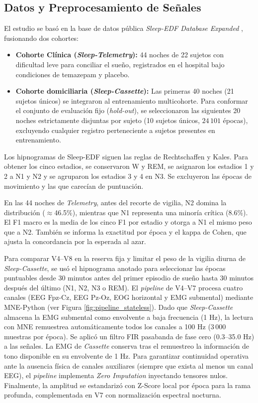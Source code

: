 \documentclass[conference]{IEEEtran}
\begin{document}
\subsection{Datos y Preprocesamiento de Señales}
El estudio se basó en la base de datos pública \textit{Sleep-EDF Database Expanded} \cite{sleepedfx_dataset,kemp2000,goldberger2000}, fusionando dos cohortes:
\begin{itemize}
    \item \textbf{Cohorte Clínica (\textit{Sleep-Telemetry}):} 44 noches de 22 sujetos con dificultad leve para conciliar el sueño, registrados en el hospital bajo condiciones de temazepam y placebo.
    \item \textbf{Cohorte domiciliaria (\textit{Sleep-Cassette}):} Las primeras 40 noches (21 sujetos únicos) se integraron al entrenamiento multicohorte. Para conformar el conjunto de evaluación fijo (\textit{hold-out}), se seleccionaron las siguientes 20 noches estrictamente disjuntas por sujeto (10 sujetos únicos, $24\,101$ épocas), excluyendo cualquier registro perteneciente a sujetos presentes en entrenamiento.
\end{itemize}

Los hipnogramas de Sleep-EDF siguen las reglas de Rechtschaffen y Kales. Para obtener los cinco estadios, se conservaron W y REM, se asignaron los estadios 1 y 2 a N1 y N2 y se agruparon los estadios 3 y 4 en N3. Se excluyeron las épocas de movimiento y las que carecían de puntuación.

En las 44 noches de \textit{Telemetry}, antes del recorte de vigilia, N2 domina la distribución ($\approx$46.5\%), mientras que N1 representa una minoría crítica (8.6\%). El F1 macro es la media de los cinco F1 por estadio y otorga a N1 el mismo peso que a N2. También se informa la exactitud por época y el kappa de Cohen, que ajusta la concordancia por la esperada al azar.

Para comparar V4--V8 en la reserva fija y limitar el peso de la vigilia diurna de \textit{Sleep-Cassette}, se usó el hipnograma anotado para seleccionar las épocas puntuables desde 30 minutos antes del primer episodio de sueño hasta 30 minutos después del último (N1, N2, N3 o REM). El \textit{pipeline} de V4--V7 procesa cuatro canales (EEG Fpz-Cz, EEG Pz-Oz, EOG horizontal y EMG submental) mediante MNE-Python \cite{gramfort2013} (ver Figura \ref{fig:pipeline_stateless}). Dado que \textit{Sleep-Cassette} almacena la EMG submental como envolvente a baja frecuencia (1 Hz), la lectura con MNE remuestrea automáticamente todos los canales a 100 Hz ($3\,000$ muestras por época). Se aplicó un filtro FIR pasabanda de fase cero (0.3--35.0 Hz) a las señales. La EMG de \textit{Cassette} conserva tras el remuestreo la información de tono disponible en su envolvente de 1 Hz. Para garantizar continuidad operativa ante la ausencia física de canales auxiliares (siempre que exista al menos un canal EEG), el \textit{pipeline} implementa \textit{Zero Imputation} inyectando tensores nulos. Finalmente, la amplitud se estandarizó con Z-Score local por época para la rama profunda, complementada en V7 con normalización espectral nocturna.
\end{document}
